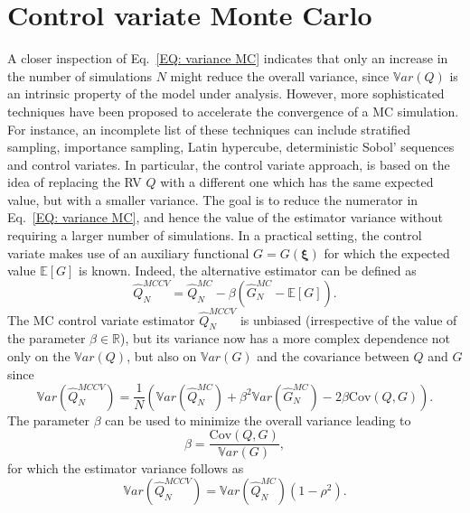 \section{Control variate Monte Carlo} \label{uq:sampling:controlvariate}
A closer inspection of Eq.~\eqref{EQ: variance MC} indicates that only an increase in the number of simulations $N$ 
might reduce the overall variance, since $\mathbb{V}ar\left({Q}\right)$ is an intrinsic property of the model under analysis. However, 
more sophisticated  techniques have been proposed to accelerate the convergence of a MC simulation. For instance, an incomplete list 
of these techniques can include stratified sampling, importance sampling, Latin hypercube, deterministic Sobol' 
sequences and control variates. In particular, the control variate approach, is based on the idea of replacing
the RV $Q$ with a different one which has the same expected value, but with a smaller variance.
The goal is to reduce the numerator in Eq.~\eqref{EQ: variance MC}, and hence the value of the estimator variance without
requiring a larger number of simulations.
In a practical setting, the control variate makes use of an auxiliary functional $G=G(\boldsymbol{\xi})$ for which the 
expected value $\mathbb{E}\left[G\right]$ is known. Indeed, the alternative estimator can be defined as
\begin{equation} \label{EQ: control variate}
\hat{Q}_N^{MCCV} =  \hat{Q}_N^{MC} - \beta \left( \hat{G}_N^{MC} - \mathbb{E}\left[G\right] \right).
\end{equation}
The MC control variate estimator $\hat{Q}_N^{MCCV}$ is unbiased (irrespective of the value of the parameter 
$\beta \in \mathbb{R}$), but its variance now has a more complex dependence not only 
on the $\mathbb{V}ar\left({Q}\right)$, but also on $\mathbb{V}ar\left(G\right)$ and the covariance between $Q$ and $G$ since
\begin{equation}
 \mathbb{V}ar\left(\hat{Q}_N^{MCCV}\right) = \dfrac{1}{N} \left( \mathbb{V}ar\left( \hat{Q}_N^{MC} \right) + \beta^2 \mathbb{V}ar\left( \hat{G}_N^{MC} \right) - 2\beta \mathrm{Cov}\left(Q,G\right) \right).
\end{equation}
The parameter $\beta$ can be used to minimize the overall variance leading to 
\begin{equation}
\beta = \dfrac{ \mathrm{Cov}\left(Q,G\right) }{ \mathbb{V}ar\left( G \right) }, 
\end{equation}
for which the estimator variance follows as
\begin{equation}
 \mathbb{V}ar\left({\hat{Q}_N^{MCCV}}\right) = \mathbb{V}ar\left({\hat{Q}_N^{MC}}\right)\left( 1-\rho^2 \right).
\end{equation}
